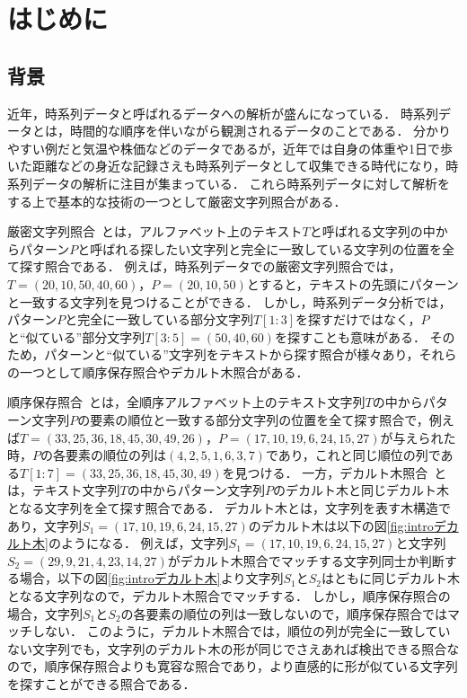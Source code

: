 \chapter{はじめに}
\section{背景}
近年，時系列データと呼ばれるデータへの解析が盛んになっている．
時系列データとは，時間的な順序を伴いながら観測されるデータのことである．
分かりやすい例だと気温や株価などのデータであるが，近年では自身の体重や1日で歩いた距離などの身近な記録さえも時系列データとして収集できる時代になり，時系列データの解析に注目が集まっている．
これら時系列データに対して解析をする上で基本的な技術の一つとして厳密文字列照合がある．

厳密文字列照合~\cite{exact}とは，アルファベット上のテキスト$T$と呼ばれる文字列の中からパターン$P$と呼ばれる探したい文字列と完全に一致している文字列の位置を全て探す照合である．
例えば，時系列データでの厳密文字列照合では，$T=(20,10,50,40,60)$，$P=(20,10,50)$とすると，テキストの先頭にパターンと一致する文字列を見つけることができる．
しかし，時系列データ分析では，パターン$P$と完全に一致している部分文字列$T[1:3]$を探すだけではなく，$P$と``似ている''部分文字列$T[3:5]=(50,40,60)$を探すことも意味がある．
そのため，パターンと``似ている''文字列をテキストから探す照合が様々あり，それらの一つとして順序保存照合やデカルト木照合がある．

順序保存照合~\cite{op}とは，全順序アルファベット上のテキスト文字列$T$の中からパターン文字列$P$の要素の順位と一致する部分文字列の位置を全て探す照合で，例えば$T=(33,25,36,18,45,30,49,26)，P=(17,10,19,6,24,15,27)$が与えられた時，$P$の各要素の順位の列は$(4,2,5,1,6,3,7)$であり，これと同じ順位の列である$T[1:7]=(33,25,36,18,45,30,49)$を見つける．
一方，デカルト木照合~\cite{cartesian-tree}とは，テキスト文字列$T$の中からパターン文字列$P$のデカルト木と同じデカルト木となる文字列を全て探す照合である．
デカルト木とは，文字列を表す木構造であり，文字列$S_1=(17,10,19,6,24,15,27)$のデカルト木は以下の図\ref{fig:introデカルト木}のようになる．
例えば，文字列$S_1=(17,10,19,6,24,15,27)$と文字列$S_2=(29,9,21,4,23,14,27)$がデカルト木照合でマッチする文字列同士か判断する場合，以下の図\ref{fig:introデカルト木}より文字列$S_1$と$S_2$はともに同じデカルト木となる文字列なので，デカルト木照合でマッチする．
しかし，順序保存照合の場合，文字列$S_1$と$S_2$の各要素の順位の列は一致しないので，順序保存照合ではマッチしない．
このように，デカルト木照合では，順位の列が完全に一致していない文字列でも，文字列のデカルト木の形が同じでさえあれば検出できる照合なので，順序保存照合よりも寛容な照合であり，より直感的に形が似ている文字列を探すことができる照合である．

